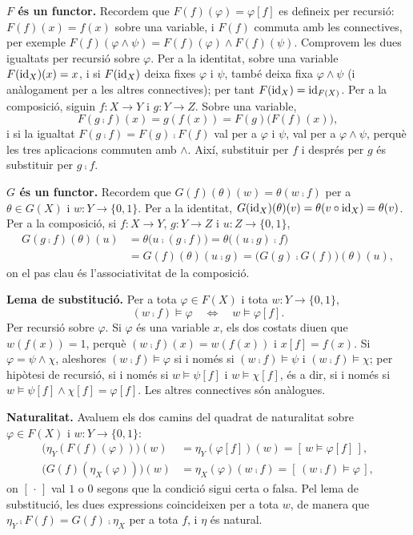 \begin{solucio}
\textbf{$F$ és un functor.} Recordem que $F(f)(\varphi)=\varphi[f]$ es defineix per recursió: $F(f)(x)=f(x)$ sobre una variable, i $F(f)$ commuta amb les connectives, per exemple $F(f)(\varphi\land\psi)=F(f)(\varphi)\land F(f)(\psi)$. Comprovem les dues igualtats per recursió sobre $\varphi$. Per a la identitat, sobre una variable $F(\operatorname{id}_X)(x)=x$, i si $F(\operatorname{id}_X)$ deixa fixes $\varphi$ i $\psi$, també deixa fixa $\varphi\land\psi$ (i anàlogament per a les altres connectives); per tant $F(\operatorname{id}_X)=\operatorname{id}_{F(X)}$. Per a la composició, siguin $f\colon X\to Y$ i $g\colon Y\to Z$. Sobre una variable,
\[
F(g\comp f)(x)=g(f(x))=F(g)\bigl(F(f)(x)\bigr),
\]
i si la igualtat $F(g\comp f)=F(g)\comp F(f)$ val per a $\varphi$ i $\psi$, val per a $\varphi\land\psi$, perquè les tres aplicacions commuten amb $\land$. Així, substituir per $f$ i després per $g$ és substituir per $g\comp f$.

\textbf{$G$ és un functor.} Recordem que $G(f)(\theta)(w)=\theta(w\comp f)$ per a $\theta\in G(X)$ i $w\colon Y\to\{0,1\}$. Per a la identitat, $G(\operatorname{id}_X)(\theta)(v)=\theta(v\circ\operatorname{id}_X)=\theta(v)$. Per a la composició, si $f\colon X\to Y$, $g\colon Y\to Z$ i $u\colon Z\to\{0,1\}$,
\[
\begin{aligned}
G(g\comp f)(\theta)(u)
&=\theta\bigl(u\comp(g\comp f)\bigr)
=\theta\bigl((u\comp g)\comp f\bigr)\\
&=G(f)(\theta)(u\comp g)
=\bigl(G(g)\comp G(f)\bigr)(\theta)(u),
\end{aligned}
\]
on el pas clau és l'associativitat de la composició.

\textbf{Lema de substitució.} Per a tota $\varphi\in F(X)$ i tota $w\colon Y\to\{0,1\}$,
\[
(w\comp f)\models\varphi
\quad\Longleftrightarrow\quad
w\models\varphi[f].
\]
Per recursió sobre $\varphi$. Si $\varphi$ és una variable $x$, els dos costats diuen que $w(f(x))=1$, perquè $(w\comp f)(x)=w(f(x))$ i $x[f]=f(x)$. Si $\varphi=\psi\land\chi$, aleshores $(w\comp f)\models\varphi$ si i només si $(w\comp f)\models\psi$ i $(w\comp f)\models\chi$; per hipòtesi de recursió, si i només si $w\models\psi[f]$ i $w\models\chi[f]$, és a dir, si i només si $w\models\psi[f]\land\chi[f]=\varphi[f]$. Les altres connectives són anàlogues.

\textbf{Naturalitat.} Avaluem els dos camins del quadrat de naturalitat sobre $\varphi\in F(X)$ i $w\colon Y\to\{0,1\}$:
\[
\begin{aligned}
\bigl(\eta_Y(F(f)(\varphi))\bigr)(w)&=\eta_Y(\varphi[f])(w)=[\,w\models\varphi[f]\,],\\
\bigl(G(f)(\eta_X(\varphi))\bigr)(w)&=\eta_X(\varphi)(w\comp f)=[\,(w\comp f)\models\varphi\,],
\end{aligned}
\]
on $[\,\cdot\,]$ val $1$ o $0$ segons que la condició sigui certa o falsa. Pel lema de substitució, les dues expressions coincideixen per a tota $w$, de manera que $\eta_Y\comp F(f)=G(f)\comp\eta_X$ per a tota $f$, i $\eta$ és natural.
\end{solucio}

